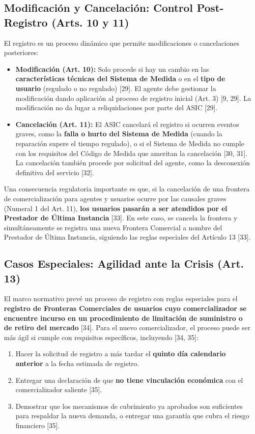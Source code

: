 \documentclass[a5paper]{book}%
\begin{document}
  \subsection{Modificación y Cancelación: Control Post-Registro (Arts. 10 y 11)}
  
  El registro es un proceso dinámico que permite modificaciones o cancelaciones posteriores:
  
  \begin{itemize}
  	\item \textbf{Modificación (Art. 10):} Solo procede si hay un cambio en las \textbf{características técnicas del Sistema de Medida} o en el \textbf{tipo de usuario} (regulado o no regulado) [29]. El agente debe gestionar la modificación dando aplicación al proceso de registro inicial (Art. 3\textdegree) [9, 29]. La modificación no da lugar a reliquidaciones por parte del ASIC [29].
  	\item \textbf{Cancelación (Art. 11):} El ASIC cancelará el registro si ocurren eventos graves, como la \textbf{falla o hurto del Sistema de Medida} (cuando la reparación supere el tiempo regulado), o si el Sistema de Medida no cumple con los requisitos del Código de Medida que ameritan la cancelación [30, 31]. La cancelación también procede por solicitud del agente, como la desconexión definitiva del servicio [32].
  \end{itemize}
  
  Una consecuencia regulatoria importante es que, si la cancelación de una frontera de comercialización para agentes y usuarios ocurre por las causales graves (Numeral 1 del Art. 11), \textbf{los usuarios pasarán a ser atendidos por el Prestador de Última Instancia} [33]. En este caso, se cancela la frontera y simultáneamente se registra una nueva Frontera Comercial a nombre del Prestador de Última Instancia, siguiendo las reglas especiales del Artículo 13 [33].
  
  \subsection{Casos Especiales: Agilidad ante la Crisis (Art. 13)}
  
  El marco normativo prevé un proceso de registro con reglas especiales para el \textbf{registro de Fronteras Comerciales de usuarios cuyo comercializador se encuentre incurso en un procedimiento de limitación de suministro o de retiro del mercado} [34]. Para el nuevo comercializador, el proceso puede ser más ágil si cumple con requisitos específicos, incluyendo [34, 35]:
  \begin{enumerate}
  	\item Hacer la solicitud de registro a más tardar el \textbf{quinto día calendario anterior} a la fecha estimada de registro.
  	\item Entregar una declaración de que \textbf{no tiene vinculación económica} con el comercializador saliente [35].
  	\item Demostrar que los mecanismos de cubrimiento ya aprobados son suficientes para respaldar la nueva demanda, o entregar una garantía que cubra el riesgo financiero [35].
  \end{enumerate}
  
\end{document}
